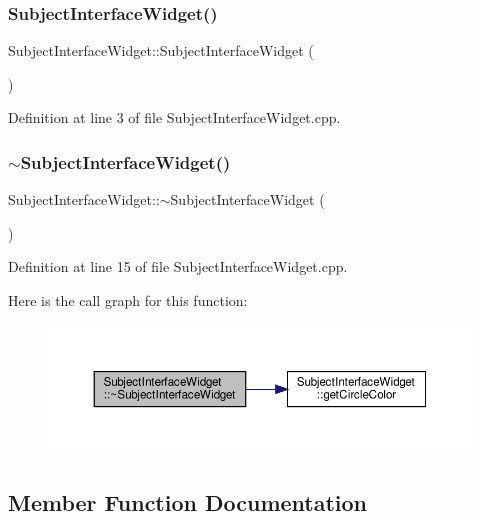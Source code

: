 \subsubsection{\texorpdfstring{Subject\+Interface\+Widget()}{SubjectInterfaceWidget()}}
{\footnotesize\ttfamily Subject\+Interface\+Widget\+::\+Subject\+Interface\+Widget (\begin{DoxyParamCaption}{ }\end{DoxyParamCaption})}



Definition at line 3 of file Subject\+Interface\+Widget.\+cpp.

\mbox{\label{class_subject_interface_widget_a0c93dc94a03c3cd52de4e990f4f54098}} 
\subsubsection{\texorpdfstring{$\sim$\+Subject\+Interface\+Widget()}{~SubjectInterfaceWidget()}}
{\footnotesize\ttfamily Subject\+Interface\+Widget\+::$\sim$\+Subject\+Interface\+Widget (\begin{DoxyParamCaption}{ }\end{DoxyParamCaption})}



Definition at line 15 of file Subject\+Interface\+Widget.\+cpp.

Here is the call graph for this function\+:
\nopagebreak
\begin{figure}[H]
\begin{center}
\leavevmode
\includegraphics[width=350pt]{class_subject_interface_widget_a0c93dc94a03c3cd52de4e990f4f54098_cgraph}
\end{center}
\end{figure}


\subsection{Member Function Documentation}
\mbox{\label{class_subject_interface_widget_aec81ec9335ff92a02dc98703405b076f}} 
